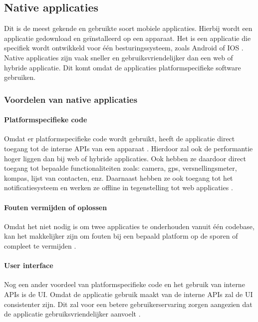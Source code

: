 \subsection{Native applicaties}\label{ch:native-applicaties}
Dit is de meest gekende en gebruikte soort mobiele applicaties. Hierbij wordt een applicatie 
gedownload en geïnstalleerd op een apparaat. Het is een applicatie die specifiek wordt ontwikkeld 
voor één besturingssysteem, zoals Android of IOS \autocite{Laarhoven2021}. Native applicaties 
zijn vaak sneller en gebruiksvriendelijker dan een web of hybride applicatie. Dit komt omdat 
de applicaties platformspecifieke software gebruiken. 

\subsubsection{Voordelen van native applicaties}
\label{ch:voordelen-native-applicaties}
\paragraph{Platformspecifieke code}
Omdat er platformspecifieke code wordt gebruikt, heeft de applicatie direct toegang tot 
de interne APIs van een apparaat \autocite{AWS2023}. Hierdoor zal ook de performantie hoger 
liggen dan bij web of hybride applicaties. Ook hebben ze daardoor direct toegang tot bepaalde 
functionaliteiten zoals: camera, gps, versnellingsmeter, kompas, lijst van contacten, enz. 
Daarnaast hebben ze ook toegang tot het notificatiesysteem en werken ze offline in tegenstelling 
tot web applicaties \autocite{Budiu2016}. 

\paragraph{Fouten vermijden of oplossen}
Omdat het niet nodig is om twee applicaties te onderhouden vanuit één \gls{codebase}, kan 
het makkelijker zijn om fouten bij een bepaald platform op de sporen of compleet te 
vermijden \autocite{Koffer2023}. 

\paragraph{User interface}
Nog een ander voordeel van platformspecifieke code en het gebruik van interne APIs is de UI. 
Omdat de applicatie gebruik maakt van de interne APIs zal de UI consistenter zijn. 
Dit zal voor een betere gebruikerservaring zorgen aangezien dat de applicatie gebruiksvriendelijker 
aanvoelt \autocite{Kotlin2023}. 

